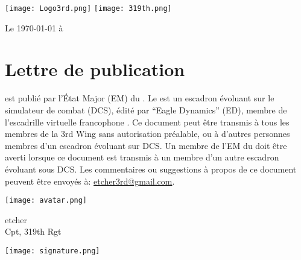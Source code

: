 \fancyhf{}
\renewcommand{\headrulewidth}{0pt}%
%
\texttt{[image: Logo3rd.png]} \hfill \texttt{[image: 319th.png]}%
%
\begin{flushright}Le \today{} à \currenttime{}\end{flushright}%
%
%
\section*{Lettre de publication}%
%
%
%
\vfil%
%
\docname{} est publié par l'État Major (EM) du \rgt{}.%
%
\vfil%
%
Le \rgt{} est un escadron évoluant sur le simulateur de combat \dcs{} (DCS), édité par ``Eagle Dynamics'' (ED), membre de l'escadrille virtuelle francophone \thirdwing{}.
%
\vfil%
%
%
%
Ce document peut être transmis à tous les membres de la 3rd Wing sans autorisation préalable, ou à d'autres personnes membres d'un escadron évoluant sur DCS.
%
\vfil%
%
Un membre de l'EM du \rgt{} doit être averti lorsque ce document est transmis à un membre d'un autre escadron évoluant sous DCS.
%
\vfil%
%
Les commentaires ou suggestions à propos de ce document peuvent être envoyés à: \href{mailto:etcher3rd@gmail.com}{etcher3rd@gmail.com}.
%
\vfil%
%
\begin{flushright}
    \hfill \parbox{0.3\textwidth}{\raggedright \hfill \texttt{[image: avatar.png]}} \hfil \parbox{0.4\textwidth}{\raggedright etcher \\ Cpt, 319th Rgt \\ \inmem{}}%
%    
\vfil%
%
\hfill \parbox{0.3\textwidth}{\raggedright \hfill } \hfil \parbox{0.4\textwidth}%
{\centering \texttt{[image: signature.png]}\par}%
\end{flushright}%
%
\vfil%